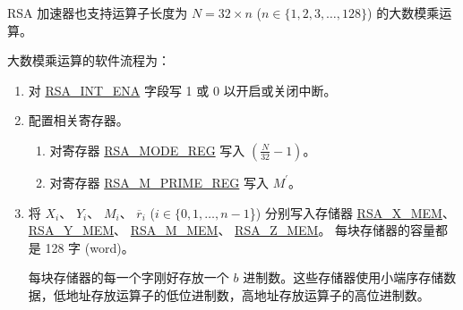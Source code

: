 \documentclass[main\_\_CN.tex]{subfiles}
\begin{document}
RSA 加速器也支持运算子长度为
\begin{math}N = 32 \times n\end{math} (\begin{math}n \in \{ 1,2,3, \dots, 128\} \end{math}) 的大数模乘运算。

大数模乘运算的软件流程为：

\begin{enumerate}

    \item 对 \hyperref[fielddesc:RSAINTENA]{RSA\_INT\_ENA} 字段写 1 或 0 以开启或关闭中断。

    \item 配置相关寄存器。

    \begin{enumerate}
        \item 对寄存器 \hyperref[regdesc:RSAMODEREG]{RSA\_MODE\_REG} 写入 \begin{math}( \frac{N}{32} - 1 )\end{math}。

        \item 对寄存器 \hyperref[regdesc:RSAMPRIMEREG]{RSA\_M\_PRIME\_REG} 写入 \begin{math}M^{\prime}\end{math}。

    \end{enumerate}

    \item 将
        \begin{math}X_{i}\end{math}、
        \begin{math}Y_{i}\end{math}、
        \begin{math}M_{i}\end{math}、
        \begin{math}\overline{r}_{i}\end{math}
        (\begin{math}i \in \{0, 1, \dots, n-1\end{math}\})
        分别写入存储器
        \hyperref[regdesc:RSAmemory]{RSA\_X\_MEM}、
        \hyperref[regdesc:RSAmemory]{RSA\_Y\_MEM}、
        \hyperref[regdesc:RSAmemory]{RSA\_M\_MEM}、
        \hyperref[regdesc:RSAmemory]{RSA\_Z\_MEM}。
        每块存储器的容量都是 128 字 (word)。

        每块存储器的每一个字刚好存放一个 \begin{math}b\end{math} 进制数。这些存储器使用小端序存储数据，低地址存放运算子的低位进制数，高地址存放运算子的高位进制数。


\end{enumerate}
\end{document}
